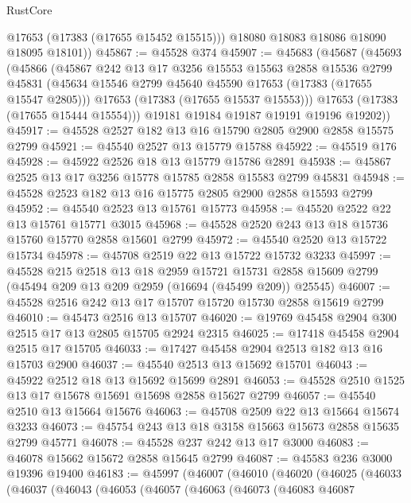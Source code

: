 \begin{lexlean}{RustCore}
\begin{coremodule}
          @17653
          (@17383 (@17655 @15452 @15515)))
        @18080
        @18083
        @18086
        @18090
        @18095
        @18101))
@45867 := @45528 @374
@45907 := @45683
    (@45687
      (@45693
        (@45866
          (@45867
            @242
            @13
            @17
            @3256
            @15553
            @15563
            @2858
            @15536
            @2799
            @45831
            (@45634 @15546 @2799 @45640 @45590 @17653 (@17383 (@17655 @15547 @2805)))
            @17653
            (@17383 (@17655 @15537 @15553)))
          @17653
          (@17383 (@17655 @15444 @15554)))
        @19181
        @19184
        @19187
        @19191
        @19196
        @19202))
@45917 := @45528 @2527 @182 @13 @16 @15790 @2805 @2900 @2858 @15575 @2799
@45921 := @45540 @2527 @13 @15779 @15788
@45922 := @45519 @176
@45928 := @45922 @2526 @18 @13 @15779 @15786 @2891
@45938 := @45867 @2525 @13 @17 @3256 @15778 @15785 @2858 @15583 @2799 @45831
@45948 := @45528 @2523 @182 @13 @16 @15775 @2805 @2900 @2858 @15593 @2799
@45952 := @45540 @2523 @13 @15761 @15773
@45958 := @45520 @2522 @22 @13 @15761 @15771 @3015
@45968 := @45528 @2520 @243 @13 @18 @15736 @15760 @15770 @2858 @15601 @2799
@45972 := @45540 @2520 @13 @15722 @15734
@45978 := @45708 @2519 @22 @13 @15722 @15732 @3233
@45997 := @45528
    @215
    @2518
    @13
    @18
    @2959
    @15721
    @15731
    @2858
    @15609
    @2799
    (@45494 @209 @13 @209 @2959 (@16694 (@45499 @209)) @25545)
@46007 := @45528 @2516 @242 @13 @17 @15707 @15720 @15730 @2858 @15619 @2799
@46010 := @45473 @2516 @13 @15707
@46020 := @19769 @45458 @2904 @300 @2515 @17 @13 @2805 @15705 @2924 @2315
@46025 := @17418 @45458 @2904 @2515 @17 @15705
@46033 := @17427 @45458 @2904 @2513 @182 @13 @16 @15703 @2900
@46037 := @45540 @2513 @13 @15692 @15701
@46043 := @45922 @2512 @18 @13 @15692 @15699 @2891
@46053 := @45528 @2510 @1525 @13 @17 @15678 @15691 @15698 @2858 @15627 @2799
@46057 := @45540 @2510 @13 @15664 @15676
@46063 := @45708 @2509 @22 @13 @15664 @15674 @3233
@46073 := @45754 @243 @13 @18 @3158 @15663 @15673 @2858 @15635 @2799 @45771
@46078 := @45528 @237 @242 @13 @17 @3000
@46083 := @46078 @15662 @15672 @2858 @15645 @2799
@46087 := @45583 @236 @3000 @19396 @19400
@46183 := @45997
    (@46007
      (@46010
        (@46020
          (@46025
            (@46033
              (@46037
                (@46043
                  (@46053
                    (@46057
                      (@46063
                        (@46073
                          (@46083
                            @46087

\end{coremodule}
\end{lexlean}
